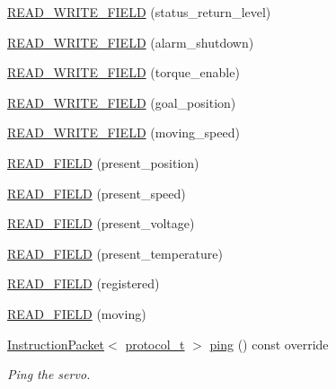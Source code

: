 \begin{DoxyCompactItemize}
\item 
\hyperlink{classdynamixel_1_1servos_1_1_servo_adff1f1c1cab4ff1313f38801dd793b84}{R\+E\+A\+D\+\_\+\+W\+R\+I\+T\+E\+\_\+\+F\+I\+E\+LD} (status\+\_\+return\+\_\+level)
\item 
\hyperlink{classdynamixel_1_1servos_1_1_servo_a282f154ebc133a075fbb32b0497fbac7}{R\+E\+A\+D\+\_\+\+W\+R\+I\+T\+E\+\_\+\+F\+I\+E\+LD} (alarm\+\_\+shutdown)
\item 
\hyperlink{classdynamixel_1_1servos_1_1_servo_a38f0ba19d8706cdffe1931fd0b803360}{R\+E\+A\+D\+\_\+\+W\+R\+I\+T\+E\+\_\+\+F\+I\+E\+LD} (torque\+\_\+enable)
\item 
\hyperlink{classdynamixel_1_1servos_1_1_servo_a62e1e0a0ba01efa5d5d7f4d310a70792}{R\+E\+A\+D\+\_\+\+W\+R\+I\+T\+E\+\_\+\+F\+I\+E\+LD} (goal\+\_\+position)
\item 
\hyperlink{classdynamixel_1_1servos_1_1_servo_a3928c0f3a88838a01c6cdc1747b362a0}{R\+E\+A\+D\+\_\+\+W\+R\+I\+T\+E\+\_\+\+F\+I\+E\+LD} (moving\+\_\+speed)
\item 
\hyperlink{classdynamixel_1_1servos_1_1_servo_af5e933f746897f67e33f7efee3b58fca}{R\+E\+A\+D\+\_\+\+F\+I\+E\+LD} (present\+\_\+position)
\item 
\hyperlink{classdynamixel_1_1servos_1_1_servo_a01a3cc7e52aba7cf772434d3642c06e3}{R\+E\+A\+D\+\_\+\+F\+I\+E\+LD} (present\+\_\+speed)
\item 
\hyperlink{classdynamixel_1_1servos_1_1_servo_a3b7845daafbf75fdfcf3d26d9bcc0dbf}{R\+E\+A\+D\+\_\+\+F\+I\+E\+LD} (present\+\_\+voltage)
\item 
\hyperlink{classdynamixel_1_1servos_1_1_servo_a0d3fbe926d5c4403f3b9f06d596daeb2}{R\+E\+A\+D\+\_\+\+F\+I\+E\+LD} (present\+\_\+temperature)
\item 
\hyperlink{classdynamixel_1_1servos_1_1_servo_a615444eaaddfc69de68bf2e65c0751e8}{R\+E\+A\+D\+\_\+\+F\+I\+E\+LD} (registered)
\item 
\hyperlink{classdynamixel_1_1servos_1_1_servo_a891d5b76b43a6743090fae54261214ce}{R\+E\+A\+D\+\_\+\+F\+I\+E\+LD} (moving)
\item 
\hyperlink{classdynamixel_1_1_instruction_packet}{Instruction\+Packet}$<$ \hyperlink{classdynamixel_1_1servos_1_1_servo_a7718c41cee1187b992836f4b6bad8a38}{protocol\+\_\+t} $>$ \hyperlink{classdynamixel_1_1servos_1_1_servo_a9a471486d0ec100d485c5fb4af114d38}{ping} () const override
\begin{DoxyCompactList}\small\item\em Ping the servo. \end{DoxyCompactList}\item 

\end{DoxyCompactItemize}
